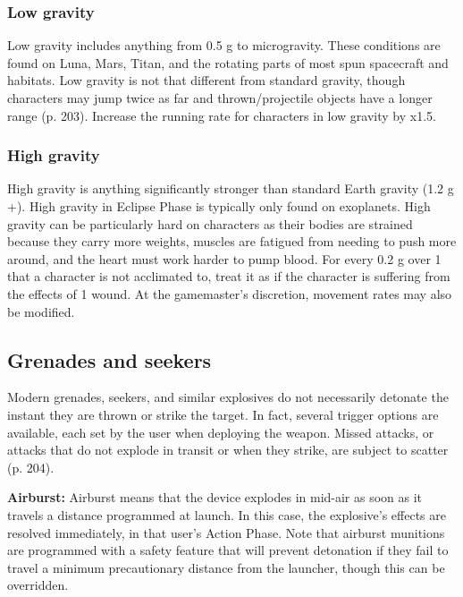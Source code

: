 \subsubsection{Low gravity}

Low gravity includes anything from 0.5 g to microgravity. These conditions are found on Luna, Mars, Titan, and the rotating parts of most spun spacecraft and habitats. Low gravity is not that different from standard gravity, though characters may jump twice as far and thrown/projectile objects have a longer range (p. 203). Increase the running rate for characters in low gravity by x1.5.

\subsubsection{High gravity}

High gravity is anything significantly stronger than standard Earth gravity (1.2 g +). High gravity in Eclipse Phase is typically only found on exoplanets. High gravity can be particularly hard on characters as their bodies are strained because they carry more weights, muscles are fatigued from needing to push more around, and the heart must work harder to pump blood. For every 0.2 g over 1 that a character is not acclimated to, treat it as if the character is suffering from the effects of 1 wound. At the gamemaster’s discretion, movement rates may also be modified.

\subsection{Grenades and seekers}
\label{sec:grenades-seekers}

Modern grenades, seekers, and similar explosives do not necessarily detonate the instant they are thrown or strike the target. In fact, several trigger options are available, each set by the user when deploying the weapon. Missed attacks, or attacks that do not explode in transit or when they strike, are subject to scatter (p. 204).

\textbf{Airburst:} Airburst means that the device explodes in mid-air as soon as it travels a distance programmed at launch. In this case, the explosive’s effects are resolved immediately, in that user’s Action Phase. Note that airburst munitions are programmed with a safety feature that will prevent detonation if they fail to travel a minimum precautionary distance from the launcher, though this can be overridden.

